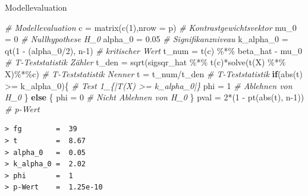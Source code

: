 \documentclass[
  8pt,
  ignorenonframetext,
]{beamer}
\newenvironment{Shaded}{\begin{snugshade}}{\end{snugshade}}
\newcommand{\AttributeTok}[1]{\textcolor[rgb]{0.77,0.63,0.00}{#1}}
\newcommand{\CommentTok}[1]{\textcolor[rgb]{0.56,0.35,0.01}{\textit{#1}}}
\newcommand{\ControlFlowTok}[1]{\textcolor[rgb]{0.13,0.29,0.53}{\textbf{#1}}}
\newcommand{\DecValTok}[1]{\textcolor[rgb]{0.00,0.00,0.81}{#1}}
\newcommand{\FloatTok}[1]{\textcolor[rgb]{0.00,0.00,0.81}{#1}}
\newcommand{\FunctionTok}[1]{\textcolor[rgb]{0.00,0.00,0.00}{#1}}
\newcommand{\NormalTok}[1]{#1}
\newcommand{\OtherTok}[1]{\textcolor[rgb]{0.56,0.35,0.01}{#1}}
\newcommand{\SpecialCharTok}[1]{\textcolor[rgb]{0.00,0.00,0.00}{#1}}
\begin{document}
\begin{frame}[fragile]{Modellevaluation}
\begin{Shaded}
\begin{Highlighting}[]
\CommentTok{\# Modellevaluation}
\NormalTok{c          }\OtherTok{=} \FunctionTok{matrix}\NormalTok{(}\FunctionTok{c}\NormalTok{(}\DecValTok{1}\NormalTok{),}\AttributeTok{nrow =}\NormalTok{ p)                                 }\CommentTok{\# Kontrastgewichtsvektor}
\NormalTok{mu\_0       }\OtherTok{=} \DecValTok{0}                                                     \CommentTok{\# Nullhypothese H\_0}
\NormalTok{alpha\_0    }\OtherTok{=} \FloatTok{0.05}                                                  \CommentTok{\# Signifikanzniveau}
\NormalTok{k\_alpha\_0  }\OtherTok{=} \FunctionTok{qt}\NormalTok{(}\DecValTok{1} \SpecialCharTok{{-}}\NormalTok{ (alpha\_0}\SpecialCharTok{/}\DecValTok{2}\NormalTok{), n}\DecValTok{{-}1}\NormalTok{)                              }\CommentTok{\# kritischer Wert}
\NormalTok{t\_num      }\OtherTok{=} \FunctionTok{t}\NormalTok{(c) }\SpecialCharTok{\%*\%}\NormalTok{ beta\_hat }\SpecialCharTok{{-}}\NormalTok{ mu\_0                              }\CommentTok{\# T{-}Teststatistik Zähler}
\NormalTok{t\_den      }\OtherTok{=} \FunctionTok{sqrt}\NormalTok{(sigsqr\_hat }\SpecialCharTok{\%*\%} \FunctionTok{t}\NormalTok{(c)}\SpecialCharTok{*}\FunctionTok{solve}\NormalTok{(}\FunctionTok{t}\NormalTok{(X) }\SpecialCharTok{\%*\%}\NormalTok{ X)}\SpecialCharTok{\%*\%}\NormalTok{c)       }\CommentTok{\# T{-}Teststatistik Nenner}
\NormalTok{t          }\OtherTok{=}\NormalTok{ t\_num}\SpecialCharTok{/}\NormalTok{t\_den                                           }\CommentTok{\# T{-}Teststatistik}
\ControlFlowTok{if}\NormalTok{(}\FunctionTok{abs}\NormalTok{(t) }\SpecialCharTok{\textgreater{}=}\NormalTok{ k\_alpha\_0)\{                                           }\CommentTok{\# Test 1\_\{|T(X) \textgreater{}= k\_alpha\_0|\}}
\NormalTok{    phi }\OtherTok{=} \DecValTok{1}                                                        \CommentTok{\# Ablehnen von H\_0}
\NormalTok{\} }\ControlFlowTok{else}\NormalTok{ \{}
\NormalTok{    phi }\OtherTok{=} \DecValTok{0}                                                        \CommentTok{\# Nicht Ablehnen von H\_0}
\NormalTok{\}}
\NormalTok{pval      }\OtherTok{=} \DecValTok{2}\SpecialCharTok{*}\NormalTok{(}\DecValTok{1} \SpecialCharTok{{-}} \FunctionTok{pt}\NormalTok{(}\FunctionTok{abs}\NormalTok{(t), n}\DecValTok{{-}1}\NormalTok{))                                }\CommentTok{\# p{-}Wert}
\end{Highlighting}
\end{Shaded}

\vspace{-2mm}

\begin{verbatim}
> fg        =  39 
> t         =  8.67 
> alpha_0   =  0.05 
> k_alpha_0 =  2.02 
> phi       =  1 
> p-Wert    =  1.25e-10
\end{verbatim}
\end{frame}
\end{document}
